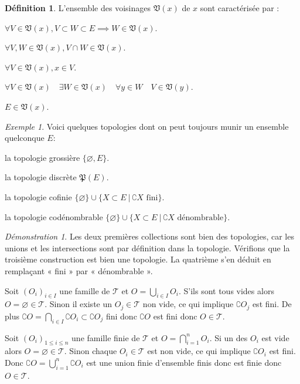 \documentclass[a4paper, 11pt, french]{book}
\newenvironment{itemise}{\itemize}{\enditemize}
\theoremstyle{plain} %
\theoremstyle{definition} %
\newtheorem{definition}{Définition}
\theoremstyle{remark} %
\newtheorem{exemple}{Exemple}
\newtheorem*{demonstration}{Démonstration}
\newcommand{\1}{\mathds{1}}
\newcommand\vide{\varnothing}
\renewcommand{\frak}[1]{\mathfrak{#1}}
\newcommand{\scr}[1]{\mathscr{#1}}
\newcommand\ens[2]{\{#1 \ |\ #2\}}
\begin{document}
\begin{definition}
	L'ensemble des voisinages $\frak{V}(x)$ de $x$ sont caractérisée par : 
	\begin{itemise}
		\item $\forall V\in\frak{V}(x), V\subset W\subset E\implies W\in\frak{V}(x)$.
		\item $\forall V, W\in\frak{V}(x), V\cap W\in\frak{V}(x)$.
		\item $\forall V\in\frak{V}(x), x\in V$.
		\item $\forall V\in\frak{V}(x)\quad\exists W\in\frak{V}(x)\quad\forall y\in W\quad V\in\frak{V}(y)$.
		\item $E\in\frak{V}(x)$.
	\end{itemise}
\end{definition}

\begin{exemple}
	Voici quelques topologies dont on peut toujours munir un ensemble quelconque $E$:
	\begin{itemise}
		\item la topologie grossière $\{\vide, E\}$.
		\item la topologie discrète $\frak{P}(E)$.
		\item la topologie cofinie $\{\vide\}\cup\ens{X\subset E}{\text{$\complement X$ fini}}$.
		\item la topologie codénombrable $\{\vide\}\cup\ens{X\subset E}{\complement X\text{ dénombrable}}$.
	\end{itemise}
\end{exemple}

\begin{demonstration}
	Les deux premières collections sont bien des topologies, car les unions et les intersections sont par définition dans la topologie.
	Vérifions que la troisième construction est bien une topologie.
	La quatrième s'en déduit en remplaçant « fini » par « dénombrable ».
	\begin{itemise}
		\item Soit $(O_i)_{i\in I}$ une famille de $\scr{T}$ et $O=\bigcup_{i\in I}O_i$.
		S'ils sont tous vides alors $O=\vide\in\scr{T}$.
		Sinon il existe un $O_j\in\scr{T}$ non vide, ce qui implique $\complement O_j$ est fini.
		De plus $\complement O=\bigcap_{i\in I}\complement O_i\subset\complement O_j$ fini donc $\complement O$ est fini donc $O\in\scr{T}$.
		\item Soit $(O_i)_{1\leqslant i\leqslant n}$ une famille finie de $\scr{T}$ et $O=\bigcap_{i=1}^nO_i$.
		Si un des $O_i$ est vide alors $O=\vide\in\scr{T}$.
		Sinon chaque $O_i\in\scr{T}$ est non vide, ce qui implique $\complement O_i$ est fini.
		Donc $\complement O=\bigcup_{i=1}^n\complement O_i$ est une union finie d'ensemble finis donc est finie donc $O\in\scr{T}$.
	\end{itemise}
\end{demonstration}
\end{document}
